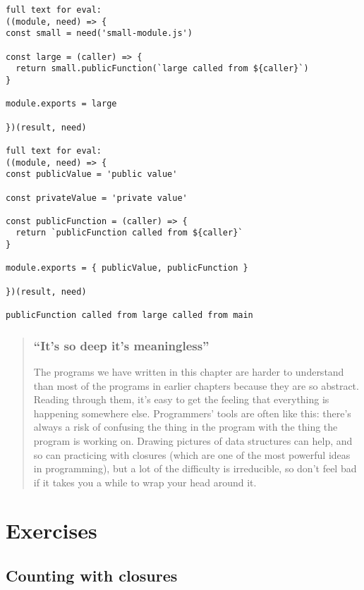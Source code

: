 \documentclass[krantzl]{krantz}
\newenvironment{callout}{\savenotes\begin{tBox}\begin{quotation}\toggletrue{inbox}\renewcommand{\thempfootnote}{\arabic{footnote}}}{\end{quotation}\vspace{\baselineskip}\end{tBox}\togglefalse{inbox}\spewnotes}
\begin{document}
\begin{lstlisting}[frame=tblr,backgroundcolor=\color{black!5}]
full text for eval:
((module, need) => {
const small = need('small-module.js')

const large = (caller) => {
  return small.publicFunction(`large called from ${caller}`)
}

module.exports = large

})(result, need)

full text for eval:
((module, need) => {
const publicValue = 'public value'

const privateValue = 'private value'

const publicFunction = (caller) => {
  return `publicFunction called from ${caller}`
}

module.exports = { publicValue, publicFunction }

})(result, need)

publicFunction called from large called from main
\end{lstlisting}


\begin{callout}


\subsubsection*{“It’s so deep it’s meaningless”}


The programs we have written in this chapter are harder to understand
than most of the programs in earlier chapters
because they are so abstract.
Reading through them,
it’s easy to get the feeling that everything is happening somewhere else.
Programmers’ tools are often like this:
there’s always a risk of confusing the thing in the program
with the thing the program is working on.
Drawing pictures of data structures can help,
and so can practicing with closures
(which are one of the most powerful ideas in programming),
but a lot of the difficulty is irreducible,
so don’t feel bad if it takes you a while to wrap your head around it.

\end{callout}

\section{Exercises}\label{module-loader-exercises}

\subsection*{Counting with closures}
\end{document}
